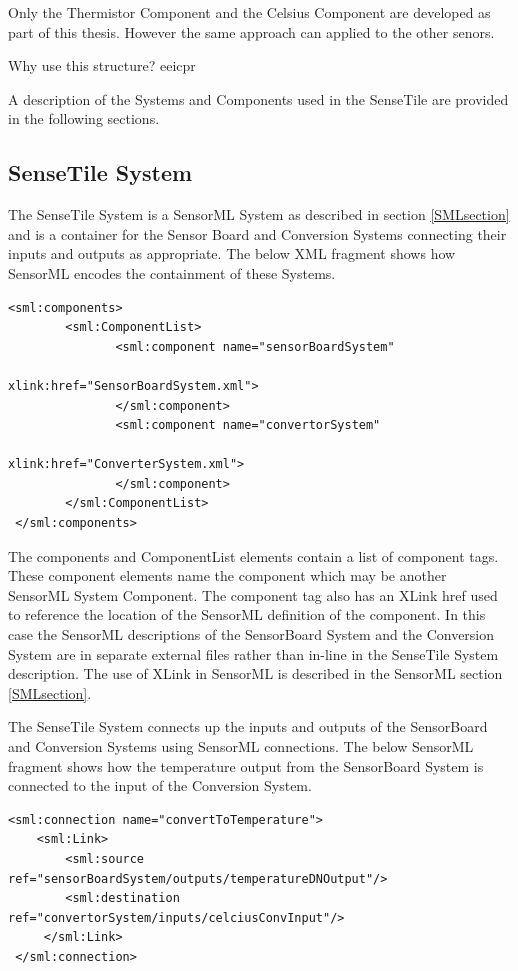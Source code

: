 \documentclass[]{final_report}
\begin{document}
Only the Thermistor Component and the Celsius Component are developed as part of this thesis. However the same approach can applied to the other senors.

Why use this structure? eeicpr

A description of the Systems and Components used in the SenseTile are provided in the following sections.

\subsection{SenseTile System}
The SenseTile System is a SensorML System as described in section \ref{SMLsection} and is a container for the Sensor Board and Conversion Systems connecting their inputs and outputs as appropriate. The below XML fragment shows how SensorML encodes the containment of these Systems. 
\lstset{language=XML,basicstyle=\scriptsize,frame=single}
\begin{lstlisting}
<sml:components>
        <sml:ComponentList>
               <sml:component name="sensorBoardSystem" 
                                          xlink:href="SensorBoardSystem.xml">
               </sml:component>
               <sml:component name="convertorSystem"  
                                          xlink:href="ConverterSystem.xml">
               </sml:component>
        </sml:ComponentList>			   
 </sml:components>
\end{lstlisting}
The components and ComponentList elements contain a list of component tags. These component elements name the component which may be another SensorML System  Component. The component tag also has an XLink href used to reference the location of the SensorML definition of the component.  In this case the SensorML descriptions of the SensorBoard System and the Conversion System are in separate external files rather than in-line in the SenseTile System description. The use of XLink in SensorML is described in the SensorML section \ref{SMLsection}.

The SenseTile System connects up the inputs and outputs of the SensorBoard and Conversion Systems using SensorML connections. The below SensorML fragment shows how the temperature output from the SensorBoard System is connected to the input of the Conversion System.

\begin{lstlisting}
<sml:connection name="convertToTemperature">
    <sml:Link>
        <sml:source ref="sensorBoardSystem/outputs/temperatureDNOutput"/>
        <sml:destination ref="convertorSystem/inputs/celciusConvInput"/>
     </sml:Link>
 </sml:connection>
\end{lstlisting}
\end{document}

